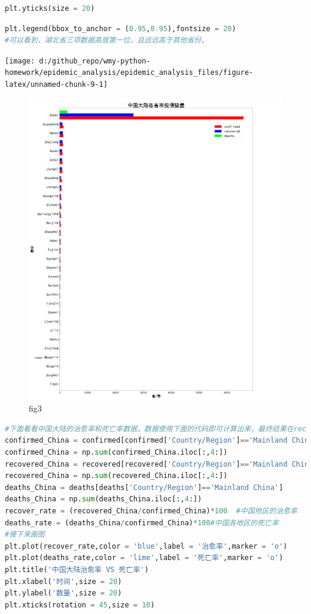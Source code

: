 \documentclass[UTF8,a4paper,12pt]{ctexart}  %
\begin{document}
\begin{lstlisting}[language=Python]
plt.yticks(size = 20)
\end{lstlisting}

\begin{lstlisting}[language=Python]
plt.legend(bbox_to_anchor = (0.95,0.95),fontsize = 20)
#可以看到，湖北省三项数据高居第一位，且远远高于其他省份。
\end{lstlisting}

\begin{center}\texttt{[image: d:/github\_repo/wmy-python-homework/epidemic\_analysis/epidemic\_analysis\_files/figure-latex/unnamed-chunk-9-1]} \end{center}

\begin{figure}
\centering
\includegraphics{./fig3.png}
\caption{fig3}
\end{figure}

\begin{lstlisting}[language=Python]
#下面看看中国大陆的治愈率和死亡率数据，数据使用下面的代码即可计算出来，最终结果在recover_rate和death_rate里。
confirmed_China = confirmed[confirmed['Country/Region']=='Mainland China']
confirmed_China = np.sum(confirmed_China.iloc[:,4:])
recovered_China = recovered[recovered['Country/Region']=='Mainland China']
recovered_China = np.sum(recovered_China.iloc[:,4:])
deaths_China = deaths[deaths['Country/Region']=='Mainland China']
deaths_China = np.sum(deaths_China.iloc[:,4:])
recover_rate = (recovered_China/confirmed_China)*100  #中国地区的治愈率
deaths_rate = (deaths_China/confirmed_China)*100#中国各地区的死亡率
#接下来画图
plt.plot(recover_rate,color = 'blue',label = '治愈率',marker = 'o')
plt.plot(deaths_rate,color = 'lime',label = '死亡率',marker = 'o')
plt.title('中国大陆治愈率 VS 死亡率')
plt.xlabel('时间',size = 20)
plt.ylabel('数量',size = 20)
plt.xticks(rotation = 45,size = 10)
\end{lstlisting}
\end{document}
